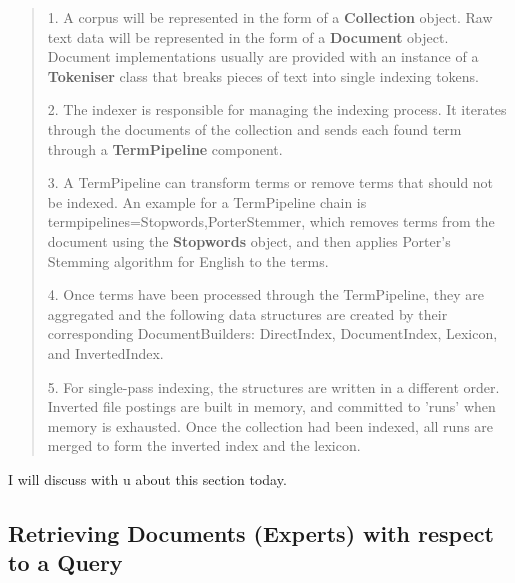 \begin{quotation}
 \item 1. A corpus will be represented in the form of a \textbf{Collection} object. Raw text data will be represented in the form of a \textbf{Document} object. 
 Document implementations usually are provided with an instance of a \textbf{Tokeniser} class that breaks pieces of text into single indexing tokens.
 \item 2. The indexer is responsible for managing the indexing process. It iterates through the documents of the collection and sends each found 
 term through a \textbf{TermPipeline} component.
 \item 3. A TermPipeline can transform terms or remove terms that should not be indexed. An example for a TermPipeline chain is 
 termpipelines=Stopwords,PorterStemmer, which removes terms from the document using the \textbf{Stopwords} object, and then applies Porter's Stemming algorithm 
 for English to the terms.
 \item 4. Once terms have been processed through the TermPipeline, they are aggregated and the following data structures are created by their corresponding 
 DocumentBuilders: DirectIndex, DocumentIndex, Lexicon, and InvertedIndex.
 \item 5. For single-pass indexing, the structures are written in a different order. Inverted file postings are built in memory, and committed to 'runs' 
 when memory is exhausted. Once the collection had been indexed, all runs are merged to form the inverted index and the lexicon.
\end{quotation}

I will discuss with u about this section today.

\subsection{Retrieving Documents (Experts) with respect to a Query} \label{section:union}


